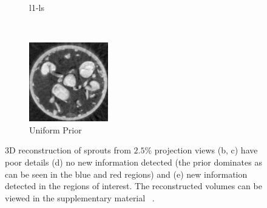\documentclass[journal]{IEEEtran}
\begin{document}
\begin{figure}[!h]
\begin{subfigure}[b]{0.3\linewidth}
        \caption{l1-ls}
     \end{subfigure}\\
\quad
    \begin{subfigure}[b]{0.3\linewidth}
        \includegraphics[width=\textwidth]{../images/sprouts/plainPriorIm.png}
        \caption{Uniform Prior}
     \end{subfigure}
     \caption{3D reconstruction of sprouts from $2.5\%$ projection
       views (b, c) have poor details (d) no new information detected
       (the prior dominates as can be seen in the blue and red
       regions) and (e) new information detected in the regions of
       interest. The reconstructed volumes can be viewed in the supplementary material
       ~\cite{supp_paper}.} 
\label{fig:sprouts_3D_results}
\end{figure}
\end{document}
